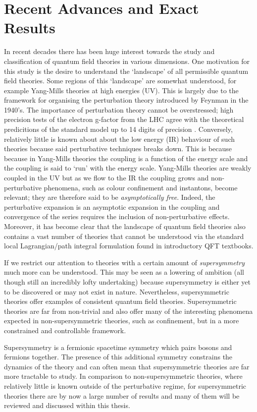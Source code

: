 \documentclass[main.tex]{subfiles}
\begin{document}
 
\section{Recent Advances and Exact Results}
In recent decades there has been huge interest towards the study and classification of quantum field theories in various dimensions. One motivation for this study is the desire to understand the `landscape' of all permissible quantum field theories. Some regions of this `landscape' are somewhat understood, for example Yang-Mills theories at high energies (UV). This is largely due to the framework for organising the perturbation theory introduced by Feynman in the 1940's. The importance of perturbation theory cannot be overstressed; high precision tests of the electron g-factor from the LHC agree with the theoretical predicitions of the standard model up to 14 digits of precision \cite{hanneke2008new}.
Conversely, relatively little is known about about the low energy (IR) behaviour of such theories because said perturbative techniques breaks down.  This is because because in Yang-Mills theories the coupling is a function of the energy scale and the coupling is said to `run' with the energy scale.  Yang-Mills theories are weakly coupled in the UV but as we flow to the IR the coupling grows and non-perturbative phenomena, such as colour confinement and instantons, become relevant; they are therefore said to be \textit{asymptotically free}.  Indeed, the perturbative expansion is an asymptotic expansion in the coupling and convergence of the series requires the inclusion of non-perturbative effects.  Moreover, it has become clear that the landscape of quantum field theories also contains a vast number of theories that cannot be understood via the standard local Lagrangian/path integral formulation found in introductory QFT textbooks.  

If we restrict our attention to theories with a certain amount of \textit{supersymmetry} much more can be understood.  This may be seen as a lowering of ambition (all though still an incredibly lofty undertaking) because supersymmetry is either yet to be discovered or may not exist in nature. Nevertheless, supersymmetric theories offer examples of consistent quantum field theories.  Supersymmetric theories are far from non-trivial and also offer many of the interesting phenomena expected in non-supersymmetric theories, such as confinement, but in a more constrained and controllable framework.

Supersymmetry is a fermionic spacetime symmetry which pairs bosons and fermions together.  The presence of this additional symmetry constrains the dynamics of the theory and can often mean that supersymmetric theories are far more tractable to study.  In comparison to non-supersymmetric theories, where relatively little is known outside of the perturbative regime, for supersymmetric theories there are by now a large number of results and many of them will be reviewed and discussed within this thesis.  
\end{document}
